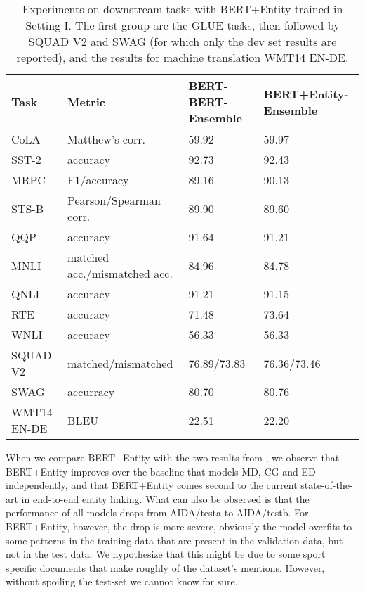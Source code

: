 \documentclass[11pt,a4paper]{article}
\begin{document}
\begin{table*}[]
\centering
\begin{tabular}{@{}llll@{}}
\toprule
Task   & Metric                       & BERT-BERT-Ensemble    & BERT+Entity-Ensemble \\ \midrule
CoLA   & Matthew's corr.              & 59.92       & 59.97           \\
SST-2  & accuracy                     & 92.73       & 92.43           \\
MRPC   & F1/accuracy                  & 89.16       & 90.13           \\
STS-B  & Pearson/Spearman corr.       & 89.90       & 89.60           \\
QQP    & accuracy                  & 91.64       & 91.21           \\
MNLI   & matched acc./mismatched acc. & 84.96       & 84.78           \\
QNLI   & accuracy                     & 91.21       & 91.15           \\
RTE    & accuracy                     & 71.48       & 73.64           \\
WNLI   & accuracy                     & 56.33       & 56.33           \\ \midrule
SQUAD V2 & matched/mismatched           & 76.89/73.83 & 76.36/73.46     \\ \midrule
SWAG   & accurracy                    & 80.70       & 80.76           \\ \midrule
WMT14 EN-DE   & BLEU                        & 22.51       & 22.20           \\ \bottomrule
\end{tabular}
\caption{Experiments on downstream tasks with BERT+Entity trained in Setting I. The first group are the GLUE tasks, then followed by SQUAD V2 and SWAG (for which only the dev set results are reported), and the results for machine translation WMT14 EN-DE.}
\label{tab:downstream}
\end{table*}

When we compare BERT+Entity with the two results from \citet{kolitsas-etal-2018-end/Ganea}, we observe that BERT+Entity improves over the baseline that models MD, CG and ED independently, and that BERT+Entity comes second to the current state-of-the-art in end-to-end entity linking. What can also be observed is that the performance of all models drops from AIDA/testa to AIDA/testb. For BERT+Entity, however, the drop is more severe, obviously the model overfits to some patterns in the training data that are present in the validation data, but not in the test data. We hypothesize that this might be due to some sport specific documents that make roughly  of the dataset's mentions. However, without spoiling the test-set we cannot know for sure. 
\end{document}
